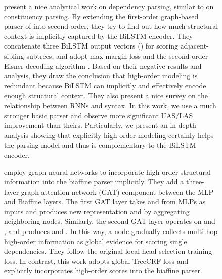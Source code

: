 \documentclass[11pt,a4paper]{article}
\begin{document}
\begin{figure}[tb]
\begin{center}
\begin{dependency}
\begin{deptext}[column sep=.16cm]
\citet{falenska-kuhn-2019-non} present a nice analytical work on  dependency parsing, similar to \citet{gaddy-etal-2018-whats} on constituency parsing.
By extending the first-order graph-based parser of \citet{kiperwasser-goldberg-2016-simple}
into second-order, they try to find out
how much structural context is implicitly captured by the BiLSTM encoder.
They concatenate three BiLSTM output vectors () for scoring adjacent-sibling subtrees,
and adopt max-margin loss and the second-order Eisner decoding algorithm \cite{mcdonald-pereira-2006-online}.
Based on their negative results and analysis, they draw the conclusion that high-order modeling is redundant
because BiLSTM can implicitly and effectively encode enough structural context.
They also present a nice survey on the relationship between RNNs and syntax.
In this work, we use a much stronger basic parser and observe more significant UAS/LAS improvement than theirs.
Particularly, we present an in-depth analysis showing that explicitly high-order modeling
certainly helps the parsing model and thus is complementary to the BiLSTM encoder.



\citet{ji-etal-2019-graph} employ graph neural networks to incorporate high-order structural information into the biaffine parser implicitly.
They add a three-layer graph attention network (GAT) component \cite{velickovic2018graph} between the MLP and Biaffine layers.
The first GAT layer takes  and  from MLPs as inputs and produces new representation  and  by aggregating neighboring nodes. Similarly, the second GAT layer operates on  and , and produces  and .
In this way, a node gradually collects multi-hop  high-order information as global evidence for scoring single dependencies.
They follow the original local head-selection training loss.
In contrast, this work adopts global TreeCRF loss and explicitly incorporates high-order scores into the biaffine parser.



\end{deptext}
\end{dependency}
\end{center}
\end{figure}
\end{document}
